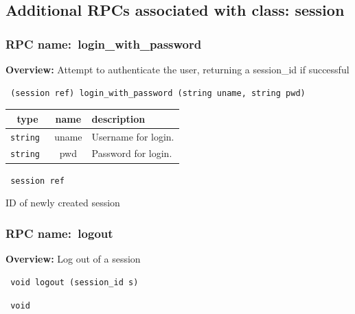 \subsection{Additional RPCs associated with class: session}
\subsubsection{RPC name:~login\_with\_password}

{\bf Overview:} 
Attempt to authenticate the user, returning a session\_id if successful

\begin{verbatim} (session ref) login_with_password (string uname, string pwd)\end{verbatim}



 
\vspace{0.3cm}
\begin{tabular}{|c|c|p{7cm}|}
 \hline
{\bf type} & {\bf name} & {\bf description} \\ \hline
{\tt string } & uname & Username for login. \\ \hline 

{\tt string } & pwd & Password for login. \\ \hline 

\end{tabular}

\vspace{0.3cm}

{\tt 
session ref
}


ID of newly created session
\vspace{0.3cm}
\vspace{0.3cm}
\vspace{0.3cm}
\subsubsection{RPC name:~logout}

{\bf Overview:} 
Log out of a session

\begin{verbatim} void logout (session_id s)\end{verbatim}


\vspace{0.3cm}

{\tt 
void
}



